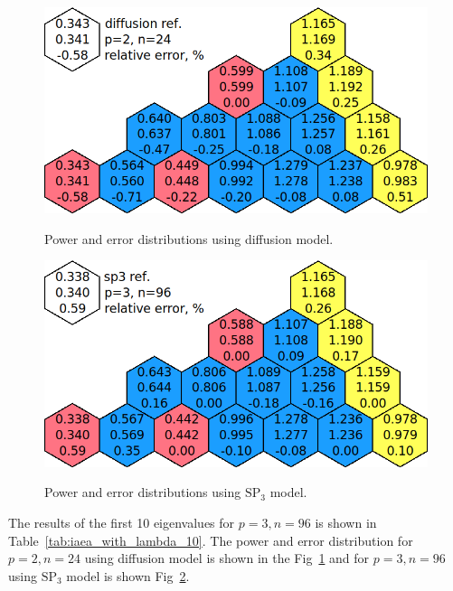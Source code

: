 \documentclass[authoryear]{elsarticle}
\begin{document}
\begin{figure}[h]
\begin{center}
	\includegraphics[width=0.85\linewidth]{diff_p2n24.png}\\
	\caption{Power and error distributions using diffusion model.}
	\label{fig:power_iaea_with_dif}
\end{center}
\end{figure}

\begin{figure}[h]
\begin{center}
	\includegraphics[width=0.85\linewidth]{sp3_p3n96.png}\\
	\caption{Power and error distributions using $\mathrm{SP_3}$ model.}
	\label{fig:power_iaea_with_sp3}
\end{center}
\end{figure}

The results of the first 10 eigenvalues for $ p = 3, n = 96 $ is shown in Table~\ref{tab:iaea_with_lambda_10}.
The power and error distribution for $p = 2, n = 24$ using diffusion model is shown in the Fig~\ref{fig:power_iaea_with_dif} and for $p = 3, n = 96$ using $\mathrm{SP_3}$ model is shown Fig~\ref{fig:power_iaea_with_sp3}.

\end{document}
